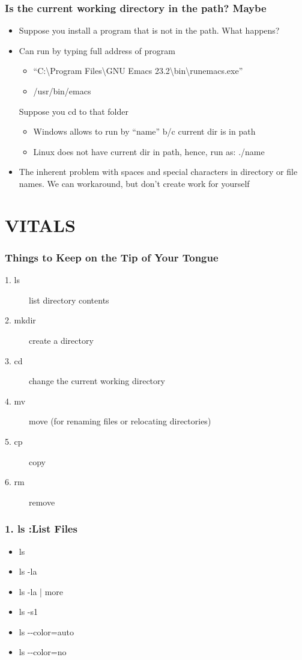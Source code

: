 \documentclass[English]{beamer}
\begin{document}
\begin{frame} 
  \frametitle{Is the current working directory in the path? Maybe}
  \begin{itemize}
  \item Suppose you install a program that is not in the path. What happens?
  \item Can run by typing full address of program
    \begin{itemize}
    \item ``C:\textbackslash{}Program Files\textbackslash{}GNU Emacs 23.2\textbackslash{}bin\textbackslash{}runemacs.exe''
    \item /usr/bin/emacs
    \end{itemize}
    Suppose you cd to that folder
    \begin{itemize}
    \item Windows allows to run by ``name'' b/c current dir is in path
    \item Linux does not have current dir in path, hence, run as:
      ./name
    \end {itemize}
    \item The inherent problem with spaces and special characters in directory or
      file names. We can workaround, but don't create work for yourself
  \end{itemize}
\end{frame}

\section{VITALS}

\begin{frame}
 \frametitle{Things to Keep on the Tip of Your Tongue}

 \begin{description}
 \item[1. ls] list directory contents
 \item[2. mkdir] create a directory
 \item[3. cd] change the current working directory
 \item[4. mv] move (for renaming files or relocating directories)
 \item[5. cp] copy
 \item[6. rm] remove
 \end{description}
\end{frame}

\begin{frame}
  \frametitle{1. ls :List Files}
  
  \begin{itemize}
  \item ls
  \item ls -la
  \item ls -la | more
  \item ls -s1
  \item ls -{}-color=auto
  \item ls -{}-color=no
  \end{itemize} 
\end{frame}
\end{document}
